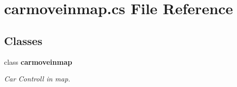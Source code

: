 \section{carmoveinmap.\+cs File Reference}
\label{carmoveinmap_8cs}
\subsection*{Classes}
\begin{DoxyCompactItemize}
\item 
class {\bf carmoveinmap}
\begin{DoxyCompactList}\small\item\em Car Controll in map. \end{DoxyCompactList}\end{DoxyCompactItemize}
